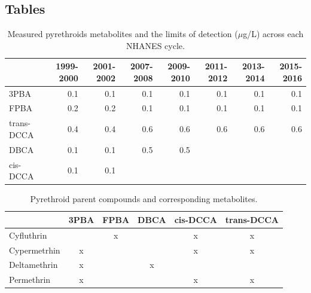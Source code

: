 \documentclass[toxics,article,submit,pdftex,moreauthors]{Definitions/mdpi}
\begin{document}
\appendixstart
\appendix
\section{}
\subsection{Tables}

\begin{table}[H]
\begin{adjustwidth}{-4cm}{}
  \caption{Measured pyrethroids metabolites and the limits of detection ($\mu$g/L) across each NHANES cycle.}
\label{tab:taba1}
\begin{tabular}{lrrrrrrr}
\toprule
  & 1999-2000 & 2001-2002 & 2007-2008 & 2009-2010 & 2011-2012 & 2013-2014 & 2015-2016\\
\midrule
3PBA & 0.1 & 0.1 & 0.1 & 0.1 & 0.1 & 0.1 & 0.1\\
FPBA & 0.2 & 0.2 & 0.1 & 0.1 & 0.1 & 0.1 & 0.1\\
trans-DCCA & 0.4 & 0.4 & 0.6 & 0.6 & 0.6 & 0.6 & 0.6\\
DBCA & 0.1 & 0.1 & 0.5 & 0.5 &  &  & \\
cis-DCCA & 0.1 & 0.1 &  &  &  &  & \\
\bottomrule
\end{tabular}
\end{adjustwidth}
\end{table}


\begin{table}[H]
\begin{adjustwidth}{-4cm}{}
\caption{\label{tab:taba2}Pyrethroid parent compounds and corresponding metabolites.}
\begin{tabular}[t]{lccccc}
\toprule
  & 3PBA & FPBA & DBCA & cis-DCCA & trans-DCCA\\
\midrule
Cyfluthrin &  & x &  & x & x\\
Cypermetrhin & x &  &  & x & x\\
Deltamethrin & x &  & x &  & \\
Permethrin & x &  &  & x & x\\
\bottomrule
\end{tabular}
\end{adjustwidth}
\end{table}
\end{document}
